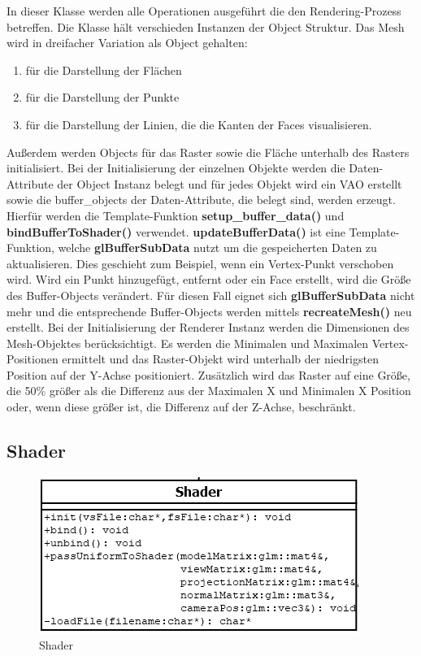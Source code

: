 	\noindent In dieser Klasse werden alle Operationen ausgeführt die den Rendering-Prozess betreffen. Die Klasse hält verschieden Instanzen der Object Struktur. Das Mesh wird in dreifacher Variation als Object gehalten:
	\begin{enumerate}
	\item für die Darstellung der Flächen
	\item für die Darstellung der Punkte
	\item für die Darstellung der Linien, die die Kanten der Faces visualisieren.
	\end{enumerate}
Außerdem werden Objects für das Raster sowie die Fläche unterhalb des Rasters initialisiert.\newline
Bei der Initialisierung der einzelnen Objekte werden die Daten-Attribute der Object Instanz belegt und für jedes Objekt wird ein VAO erstellt sowie die buffer\_objects der Daten-Attribute, die belegt sind, werden erzeugt. Hierfür werden die Template-Funktion \textbf{setup\_buffer\_data()} und \textbf{bindBufferToShader()} verwendet. \textbf{updateBufferData()} ist eine Template-Funktion, welche \textbf{glBufferSubData} nutzt um die gespeicherten Daten zu aktualisieren. Dies geschieht zum Beispiel, wenn ein Vertex-Punkt verschoben wird. Wird ein Punkt hinzugefügt, entfernt oder ein Face erstellt, wird die Größe des Buffer-Objects verändert. Für diesen Fall eignet sich \textbf{glBufferSubData} nicht mehr und die entsprechende Buffer-Objects werden mittels \textbf{recreateMesh()} neu erstellt.\newline
Bei der Initialisierung der Renderer Instanz werden die Dimensionen des Mesh-Objektes berücksichtigt. Es werden die Minimalen und Maximalen Vertex-Positionen ermittelt und das Raster-Objekt wird unterhalb der niedrigsten Position auf der Y-Achse positioniert. Zusätzlich wird das Raster auf eine Größe, die 50\% größer als die Differenz aus der Maximalen X und Minimalen X Position oder, wenn diese größer ist, die Differenz auf der Z-Achse, beschränkt.

\subsection{Shader}

	\begin{figure}[H]
	\centering
	\includegraphics[width=0.7\linewidth]{shader.png}
	\caption{Shader}
	\label{fig7}
	\end{figure}

